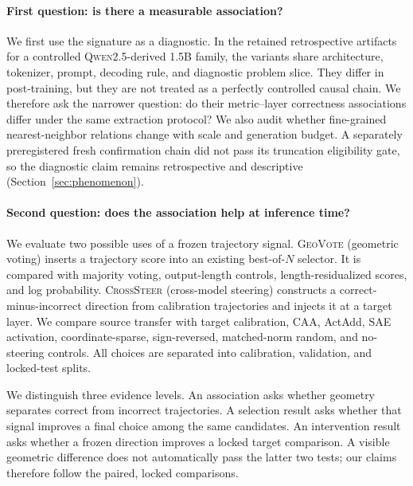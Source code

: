 \paragraph{First question: is there a measurable association?}
We first use the signature as a diagnostic.  In the retained retrospective
artifacts for a controlled \textsc{Qwen2.5}-derived 1.5B family, the variants
share architecture, tokenizer, prompt, decoding rule, and diagnostic problem
slice.  They differ in
post-training, but they are not treated as a perfectly controlled causal chain.
We therefore ask the narrower question: do their metric--layer correctness
associations differ under the same extraction protocol?  We also audit whether
fine-grained nearest-neighbor relations change with scale and generation budget.
A separately preregistered fresh confirmation chain did not pass its truncation
eligibility gate, so the diagnostic claim remains retrospective and descriptive
(Section~\ref{sec:phenomenon}).

\paragraph{Second question: does the association help at inference time?}
We evaluate two possible uses of a frozen trajectory signal.
\textsc{GeoVote} (geometric voting) inserts a trajectory score into an existing
best-of-$N$ selector.  It is compared with majority voting, output-length
controls, length-residualized scores, and log probability.  \textsc{CrossSteer}
(cross-model steering) constructs a correct-minus-incorrect direction from
calibration trajectories and injects it at a target layer.  We compare source
transfer with target calibration, CAA, ActAdd, SAE activation,
coordinate-sparse, sign-reversed, matched-norm random, and no-steering controls.
All choices are separated into calibration, validation, and locked-test splits.

We distinguish three evidence levels.  An association asks whether geometry
separates correct from incorrect trajectories.  A selection result asks whether
that signal improves a final choice among the same candidates.  An intervention
result asks whether a frozen direction improves a locked target comparison.
A visible geometric difference does not automatically pass the latter two tests;
our claims therefore follow the paired, locked comparisons.

